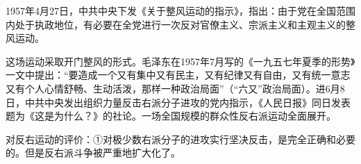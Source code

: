 {1957年4月27日，中共中央下发《关于整风运动的指示》，指出：由于党在全国范围内处于执政地位，有必要在全党进行一次{反对官僚主义、宗派主义和主观主义}的整风运动。}

{这场运动采取开门整风的形式。毛泽东在1957年7月写的《一九五七年夏季的形势》一文中提出：{``要造成一个又有集中又有民主，又有纪律又有自由，又有统一意志又有个人心情舒畅、生动活泼，那样一种政治局面}''（{``六又''政治局面}）。进6月8日，中共中央发出组织力量反击右派分子进攻的党内指示，《人民日报》同日发表题为《这是为什么？》的社论。一场全国规模的群众性{反右派运动}全面展开。}

{{对反右运动的评价}{：①对极少数右派分子的进攻实行坚决反击，是完全正确和必要的。但是反右派斗争被严重地扩大化了。}}
